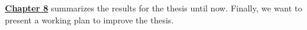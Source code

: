 	\hyperref[chap:conclusion]{\textbf{Chapter 8}} summarizes the results for the thesis until now. Finally, we want to present a working plan to improve the thesis.\nextintro

